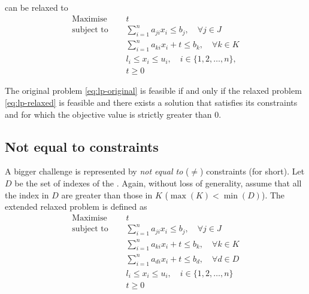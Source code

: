 \documentclass[runningheads]{llncs}
\begin{document}
can be relaxed to
\begin{equation}
    \label{eq:lp-relaxed}
    \begin{split}
        \text{Maximise }   \quad & t                                                             \\
        \text{subject to } \quad & \sum_{i=1}^{n} a_{ji}x_{i} \le b_j, \quad \forall j \in J     \\
        \quad                    & \sum_{i=1}^{n} a_{ki}x_{i} + t \le b_k, \quad \forall k \in K \\
                                 & l_i \le x_i \le u_i,  \quad i \in \{1, 2, \ldots, n\},        \\
                                 & t \ge 0
    \end{split}
\end{equation}

\begin{theorem}
    \label{thm:lp-relaxed}
    The original problem \eqref{eq:lp-original} is feasible if and only if the relaxed problem \eqref{eq:lp-relaxed} is feasible and there exists a solution that satisfies its constraints and for which the objective value is strictly greater than $0$.
\end{theorem}

\subsection{Not equal to constraints}

A bigger challenge is represented by \textit{not equal to} ($\ne$) constraints (\nqc for short).
Let $D$ be the set of indexes of the \nqcs.
Again, without loss of generality, assume that all the index in $D$ are greater than those in $K$ ($\max(K) < \min(D)$).
The extended relaxed problem is defined as
\begin{equation}
    \label{eq:lp-extended}
    \begin{split}
        \text{Maximise }   \quad & t                                                             \\
        \text{subject to } \quad & \sum_{i=1}^{n} a_{ji}x_{i} \le b_j, \quad \forall j \in J     \\
        \quad                    & \sum_{i=1}^{n} a_{ki}x_{i} + t \le b_k, \quad \forall k \in K \\
        \quad                    & \sum_{i=1}^{n} a_{di}x_{i} + t \le b_d, \quad \forall d \in D \\
                                 & l_i \le x_i \le u_i,  \quad i \in \{1, 2, \ldots, n\}         \\
                                 & t \ge 0
    \end{split}
\end{equation}
\end{document}
